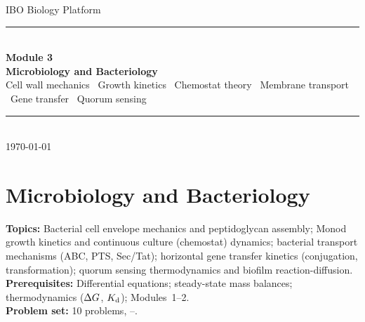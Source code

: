 \documentclass[12pt, a4paper, oneside]{report}
\begin{document}
\begin{titlepage}
  \centering
  \vspace*{4cm}
  {\sffamily\fontsize{13}{16}\selectfont\color{accent} IBO Biology Platform}\\[0.6em]
  {\rule{0.4\textwidth}{0.4pt}}\\[0.6em]
  {\sffamily\fontsize{22}{28}\selectfont\bfseries Module 3}\\[0.4em]
  {\sffamily\fontsize{16}{20}\selectfont\bfseries\color{accent}
    Microbiology and Bacteriology}\\[1.2em]
  {\small\color{gray}
    Cell wall mechanics \textbullet\ Growth kinetics \textbullet\
    Chemostat theory \textbullet\ Membrane transport \textbullet\
    Gene transfer \textbullet\ Quorum sensing}\\[0.6em]
  {\rule{0.4\textwidth}{0.4pt}}\\[0.5em]
  {\small\color{gray} \today}
\end{titlepage}

\tableofcontents
\newpage


\chapter{Microbiology and Bacteriology}
\label{ch:bacteriology}

\begin{tcolorbox}[colback=probback, colframe=accent, boxrule=0.5pt, arc=1pt,
  fonttitle=\bfseries\sffamily\small, coltitle=white, colbacktitle=accent,
  title={Module Overview}, top=4pt, bottom=4pt, left=6pt, right=6pt]
  \textbf{Topics:} Bacterial cell envelope mechanics and peptidoglycan assembly;
  Monod growth kinetics and continuous culture (chemostat) dynamics;
  bacterial transport mechanisms (ABC, PTS, Sec/Tat);
  horizontal gene transfer kinetics (conjugation, transformation);
  quorum sensing thermodynamics and biofilm reaction-diffusion.\\[3pt]
  \textbf{Prerequisites:} Differential equations; steady-state mass balances;
  thermodynamics ($\Delta G$, $K_{\mathrm{d}}$); Modules~1--2.\\[3pt]
  \textbf{Problem set:} 10 problems, \stars{2}--\stars{5}.
\end{tcolorbox}

\end{document}
